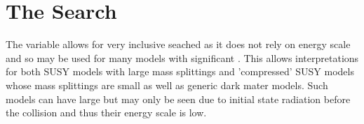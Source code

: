 
\chapter{The \alphat Search} %

\label{Chapter2} %


 
The \alphat variable allows for very inclusive seached as it does not rely on energy scale and so
may be used for many models with significant \met. This allows interpretations for both SUSY models with large mass splittings and 'compressed' SUSY models whose mass 
splittings are small as well as generic dark mater models. Such models can have large \met but may only 
be seen due to initial state radiation 
before the collision and thus their energy scale is low\cite{ISR}.

